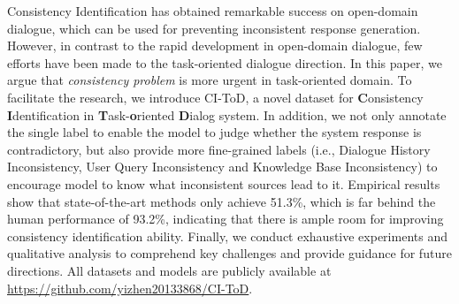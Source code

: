Consistency Identification has obtained remarkable success on open-domain dialogue, which can be used for preventing inconsistent response generation.  However, in contrast to the rapid development in open-domain dialogue, few efforts have been made to the task-oriented dialogue direction. In this paper, we argue that \textit{consistency problem} is more urgent in task-oriented domain. To facilitate the research, we introduce CI-ToD, a novel dataset for \textbf{C}onsistency \textbf{I}dentification in \textbf{T}ask-\textbf{o}riented \textbf{D}ialog system. In addition, we not only annotate the single label to enable the model to judge whether the system response is contradictory, but also provide more fine-grained labels (i.e., Dialogue History Inconsistency, User Query Inconsistency and Knowledge Base Inconsistency) to encourage model to know what inconsistent sources lead to it. Empirical results show that state-of-the-art methods only achieve 51.3\%, which is far behind the human performance of 93.2\%, indicating that there is ample room for improving consistency identification ability. Finally, we conduct exhaustive experiments and qualitative analysis to comprehend key challenges and provide guidance for future directions. All datasets and models are publicly available at \url{https://github.com/yizhen20133868/CI-ToD}.
